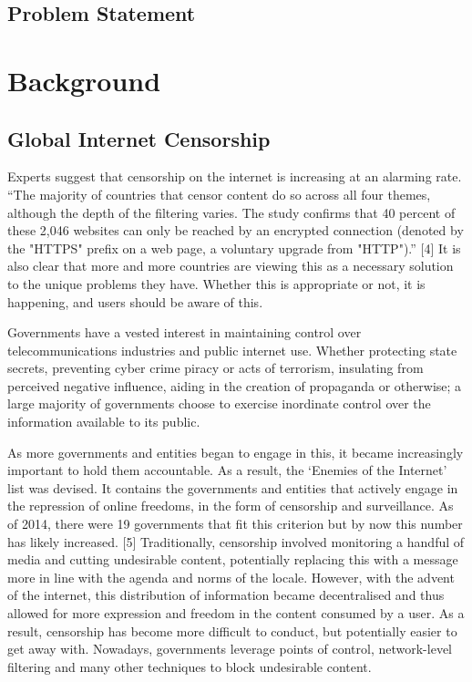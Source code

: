 \subsection{Problem Statement}

\section{Background}
\subsection{Global Internet Censorship}
Experts suggest that censorship on the internet is increasing at an alarming rate. “The majority of countries that censor content do so across all four themes, although the depth of the filtering varies. The study confirms that 40 percent of these 2,046 websites can only be reached by an 
encrypted connection (denoted by the "HTTPS" prefix on a web page, a voluntary upgrade from "HTTP").” [4] It is also clear that more and more countries are viewing this as a necessary solution to the unique problems they have. Whether this is appropriate or not, it is happening, and users should be aware of this. 

Governments have a vested interest in maintaining control over telecommunications industries and public internet use. Whether protecting state secrets, preventing cyber crime piracy or acts of terrorism, insulating from perceived negative influence, aiding in the creation of propaganda or otherwise; a large majority of governments choose to exercise inordinate control over the 
information available to its public.  

As more governments and entities began to engage in this, it became increasingly important to hold them accountable. As a result, the ‘Enemies of the Internet’ list was devised. It contains the governments and entities that actively engage in the repression of online freedoms, in the form of censorship and surveillance. As of 2014, there were 19 governments that fit this criterion but by now this number has likely increased. [5] Traditionally, censorship involved monitoring a handful of media and cutting undesirable content, potentially replacing this with a message more in line with the agenda and norms of the locale. However, with the advent of the internet, this distribution of information became decentralised and thus allowed for more expression and freedom in the content consumed by a user. As a result, censorship has become more difficult to conduct, but potentially easier to get away with. Nowadays, governments leverage points of control, network-level filtering and many other techniques to block undesirable content.

